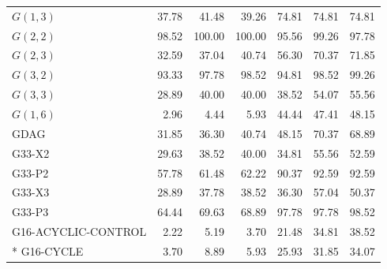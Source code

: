 \begin{longtable}{@{}lrrrrrr@{}}
\( G(1,3) \) & 37.78 & 41.48 & 39.26 & 74.81 & 74.81 & 74.81 \\
\( G(2,2) \) & 98.52 & 100.00 & 100.00 & 95.56 & 99.26 & 97.78 \\
\( G(2,3) \) & 32.59 & 37.04 & 40.74 & 56.30 & 70.37 & 71.85 \\
\( G(3,2) \) & 93.33 & 97.78 & 98.52 & 94.81 & 98.52 & 99.26 \\
\( G(3,3) \) & 28.89 & 40.00 & 40.00 & 38.52 & 54.07 & 55.56 \\
\( G(1,6) \) & 2.96 & 4.44 & 5.93 & 44.44 & 47.41 & 48.15 \\
GDAG & 31.85 & 36.30 & 40.74 & 48.15 & 70.37 & 68.89 \\
G33-X2 & 29.63 & 38.52 & 40.00 & 34.81 & 55.56 & 52.59 \\
G33-P2 & 57.78 & 61.48 & 62.22 & 90.37 & 92.59 & 92.59 \\
G33-X3 & 28.89 & 37.78 & 38.52 & 36.30 & 57.04 & 50.37 \\
G33-P3 & 64.44 & 69.63 & 68.89 & 97.78 & 97.78 & 98.52 \\
G16-ACYCLIC-CONTROL & 2.22 & 5.19 & 3.70 & 21.48 & 34.81 & 38.52 \\*
G16-CYCLE & 3.70 & 8.89 & 5.93 & 25.93 & 31.85 & 34.07 \\
\end{longtable}
\endgroup
